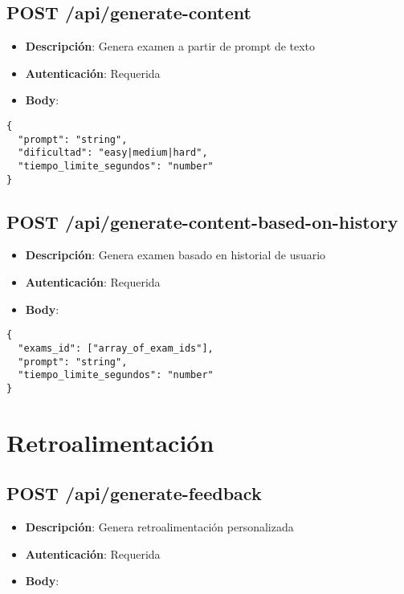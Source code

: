 \documentclass[12pt,a4paper]{report}
\begin{document}
\subsection{POST /api/generate-content}
\begin{itemize}
    \item \textbf{Descripción}: Genera examen a partir de prompt de texto
    \item \textbf{Autenticación}: Requerida
    \item \textbf{Body}:
\end{itemize}

\begin{lstlisting}
{
  "prompt": "string",
  "dificultad": "easy|medium|hard",
  "tiempo_limite_segundos": "number"
}
\end{lstlisting}

\subsection{POST /api/generate-content-based-on-history}
\begin{itemize}
    \item \textbf{Descripción}: Genera examen basado en historial de usuario
    \item \textbf{Autenticación}: Requerida
    \item \textbf{Body}:
\end{itemize}

\begin{lstlisting}
{
  "exams_id": ["array_of_exam_ids"],
  "prompt": "string",
  "tiempo_limite_segundos": "number"
}
\end{lstlisting}

\section{Retroalimentación}

\subsection{POST /api/generate-feedback}
\begin{itemize}
    \item \textbf{Descripción}: Genera retroalimentación personalizada
    \item \textbf{Autenticación}: Requerida
    \item \textbf{Body}:
\end{itemize}
\end{document}
